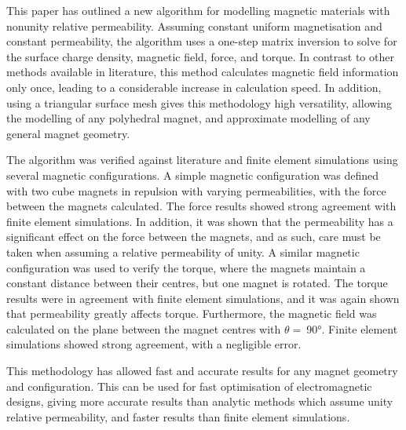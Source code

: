 This paper has outlined a new algorithm for modelling magnetic materials with nonunity relative permeability. Assuming constant uniform magnetisation and constant permeability, the algorithm uses a one-step matrix inversion to solve for the surface charge density, magnetic field, force, and torque. In contrast to other methods available in literature, this method calculates magnetic field information only once, leading to a considerable increase in calculation speed. In addition, using a triangular surface mesh gives this methodology high versatility, allowing the modelling of any polyhedral magnet, and approximate modelling of any general magnet geometry.

The algorithm was verified against literature and finite element simulations using several magnetic configurations. A simple magnetic configuration was defined with two cube magnets in repulsion with varying permeabilities, with the force between the magnets calculated. The force results showed strong agreement with finite element simulations. In addition, it was shown that the permeability has a significant effect on the force between the magnets, and as such, care must be taken when assuming a relative permeability of unity. A similar magnetic configuration was used to verify the torque, where the magnets maintain a constant distance between their centres, but one magnet is rotated. The torque results were in agreement with finite element simulations, and it was again shown that permeability greatly affects torque. Furthermore, the magnetic field was calculated on the plane between the magnet centres with \(\theta =\ \)\ang{90}. Finite element simulations showed strong agreement, with a negligible error.

This methodology has allowed fast and accurate results for any magnet geometry and configuration. This can be used for fast optimisation of electromagnetic designs, giving more accurate results than analytic methods which assume unity relative permeability, and faster results than finite element simulations.